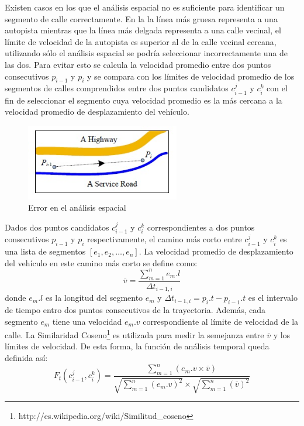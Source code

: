 Existen casos en los que el análisis espacial no es suficiente para identificar un segmento de calle correctamente. En la  la línea más gruesa representa a una autopista mientras que la línea más delgada representa a una calle vecinal, el límite de velocidad de la autopista es superior al de la calle vecinal cercana, utilizando sólo el análisis espacial se podría seleccionar incorrectamente una de las dos. Para evitar esto se calcula la velocidad promedio entre dos puntos consecutivos $p_{i-1}$ y $p_i$ y se compara con los límites de velocidad promedio de los segmentos de calles comprendidos entre dos puntos candidatos $c_{i-1}^{j}$ y $c_{i}^{k}$ con el fin de seleccionar el segmento cuya velocidad promedio es la más cercana a la velocidad promedio de desplazamiento del vehículo.

\begin{figure}[h*]
	\centering
	\includegraphics[width=0.6\textwidth]{capitulos/6/figuras/figura8.jpg}
	\caption{\label{fig:analisis_temporal} Error en el análisis espacial}	
\end{figure}

Dados dos puntos candidatos $c_{i-1}^{j}$ y $c_{i}^{k}$ correspondientes a dos puntos consecutivos $p_{i-1}$ y $p_i$ respectivamente, el camino más corto entre $c_{i-1}^{j}$ y $c_{i}^{k}$ es una lista de segmentos $[e_1, e_2, \dots, e_n]$. La velocidad promedio de desplazamiento del vehículo en este camino más corto se define como:
\begin{equation}
\overline{v} = \frac { \sum_{m=1}^{n} {e_m.l} }{ \Delta t_{i-1, i} }
\end{equation}
donde $e_m.l$ es la longitud del segmento $e_m$ y $\Delta t_{i-1, i} = p_i.t - p_{i-1}.t$ es el intervalo de tiempo entro dos puntos consecutivos de la trayectoria. Además, cada segmento $e_m$ tiene una velocidad $e_m.v$ correspondiente al límite de velocidad de la calle. La Similaridad Coseno\footnote{http://es.wikipedia.org/wiki/Similitud\_coseno} es utilizada para medir la semejanza entre $\overline{v}$ y los límites de velocidad. De esta forma, la función de análisis temporal queda definida así:
\begin{equation} \label{funcion_temporal}
F_{ t }(c_{ i-1 }^{ j },c_{ i }^{ k })=\frac { \sum _{ m=1 }^{ n }{ (e_{ m }.v\times \overline { v } ) }  }{ \sqrt { \sum _{ m=1 }^{ n }{ (e_{ m }.v)^{ 2 } }  } \times \sqrt { \sum _{ m=1 }^{ n }{ (\overline { v } )^{ 2 } }  }  } 
\end{equation}

